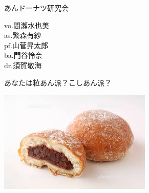 \documentclass[a4paper]{article}
\begin{document}
\begin{minipage}{\textwidth - 0.25\textheight}
    \flushleft
    \Huge \vspace{1em}あんドーナツ研究会\vspace{1em}\normalsize \\
    \begin{minipage}{11em}
        \flushleft
        \Large
        vo.間瀬水也美\\as.繁森有紗\\pf.山菅昇太郎\\ba.門谷怜奈\\dr.須賀敬海
    \end{minipage}
    \begin{minipage}{\textwidth - 18em}
        \flushleft
        \large
        あなたは粒あん派？こしあん派？
    \end{minipage}
\end{minipage}
\begin{minipage}{0.25\textheight}
    \flushleft
    \includegraphics[width=0.25\textheight]{./FULLHOUSE/resources/10.jpeg}
\end{minipage}
\end{document}
